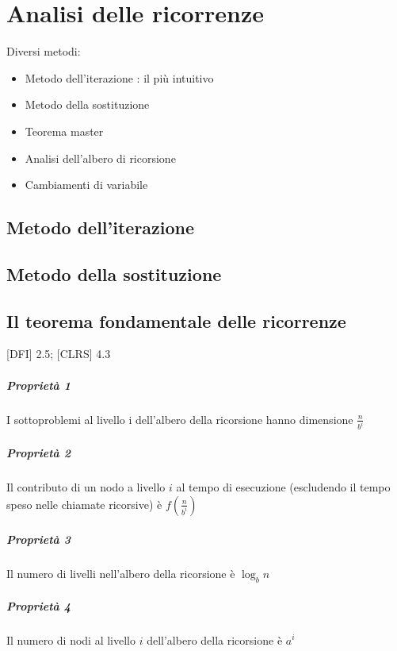 \chapter{Analisi delle ricorrenze}

Diversi metodi:

\begin{itemize}
\item Metodo dell'iterazione : il più intuitivo
\item Metodo della sostituzione
\item Teorema master
\item Analisi dell'albero di ricorsione
\item Cambiamenti di variabile
\end{itemize}


\section{Metodo dell'iterazione}


\section{Metodo della sostituzione}


\section{Il teorema fondamentale delle ricorrenze}

{{[}DFI{]} 2.5; {[}CLRS{]} 4.3}


\paragraph{Proprietà 1}
I sottoproblemi al livello i dell'albero della ricorsione hanno dimensione $\frac{n}{b^i}$

\paragraph{Proprietà 2}
Il contributo di un nodo a livello $i$ al tempo di esecuzione (escludendo il tempo speso nelle chiamate ricorsive) è $f\left(\frac{n}{b^i}\right)$

\paragraph{Proprietà 3}
Il numero di livelli nell'albero della ricorsione è $\log_b{n}$

\paragraph{Proprietà 4}
Il numero di nodi al livello $i$ dell'albero della ricorsione è $a^i$

